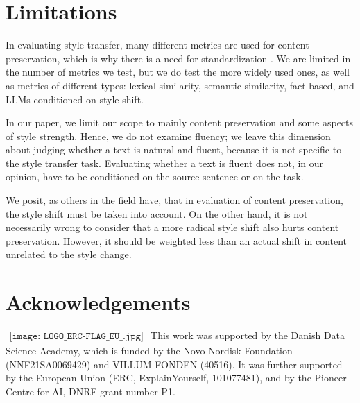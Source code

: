 \section{Limitations}
In evaluating style transfer, many different metrics are used for content preservation, which is why there is a need for standardization \cite{ostheimer-etal-2023-call}. We are limited in the number of metrics we test, but we do test the more widely used ones, as well as metrics of different types: lexical similarity, semantic similarity, fact-based, and LLMs conditioned on style shift.   

In our paper, we limit our scope to mainly content preservation and some aspects of style strength. Hence, we do not examine fluency; we leave this dimension about judging whether a text is natural and fluent, because it is not specific to the style transfer task. Evaluating whether a text is fluent does not, in our opinion, have to be conditioned on the source sentence or on the task.   

We posit, as others in the field have, that in evaluation of content preservation, the style shift must be taken into account. On the other hand, it is not necessarily wrong to consider that a more radical style shift also hurts content preservation. However, it should be weighted less than an actual shift in content unrelated to the style change.

\section*{Acknowledgements}
$\begin{array}{l}\texttt{[image: LOGO\_ERC-FLAG\_EU\_.jpg]} \end{array}$ This work was supported by the Danish Data Science Academy, which is funded by the Novo Nordisk Foundation (NNF21SA0069429) and VILLUM FONDEN (40516). 
It was further supported by the European Union (ERC, ExplainYourself, 101077481), and by the Pioneer Centre for AI, DNRF grant number P1.